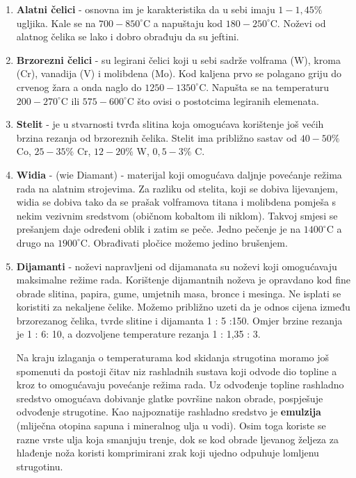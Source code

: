 \documentclass[a4paper,12pt]{article}
\numberwithin{figure}{section}
\begin{document}
\begin{enumerate}
\item \textbf{Alatni čelici} - osnovna im je karakteristika da u sebi imaju $1-1,45\%$ ugljika. Kale se na $700 - 850^{\circ}$C a napuštaju kod $180 - 250^{\circ}$C. Noževi od alatnog čelika se lako i dobro obrađuju da su jeftini.
\item \textbf{Brzorezni čelici} - su legirani čelici koji u sebi sadrže volframa (W), kroma (Cr), vanadija (V) i molibdena (Mo). Kod kaljena prvo se polagano griju do crvenog žara a onda naglo do $1250 - 1350^{\circ}$C. Napušta se na temperaturu $200 - 270^{\circ}$C ili $575 - 600^{\circ}$C što ovisi o postotcima legiranih elemenata.
\item \textbf{Stelit} - je u stvarnosti tvrđa slitina koja omogućava korištenje još većih brzina rezanja od brzoreznih čelika. Stelit ima približno sastav od $40-50\%$ Co, $25 - 35\%$ Cr, $12 - 20\%$ W, $0,5-3\%$ C.
\item \textbf{Widia} - (wie Diamant) - materijal koji omogućava daljnje povećanje režima rada na alatnim strojevima. Za razliku od stelita, koji se dobiva lijevanjem, widia se dobiva tako da se prašak volframova titana i molibdena pomješa s nekim vezivnim sredstvom (običnom kobaltom ili niklom). Takvoj smjesi se prešanjem daje određeni oblik i zatim se peče. Jedno pečenje je na $1400^{\circ}$C a drugo na $1900^{\circ}$C. Obrađivati pločice možemo jedino brušenjem.
\item \textbf{Dijamanti} - noževi napravljeni od dijamanata su noževi koji omogućavaju maksimalne režime rada. Korištenje dijamantnih noževa je opravdano kod fine obrade slitina, papira, gume, umjetnih masa, bronce i mesinga. Ne isplati se koristiti za nekaljene čelike. Možemo približno uzeti da je odnos cijena između brzorezanog čelika, tvrde slitine i dijamanta 1 : 5 :150. Omjer brzine rezanja je 1 : 6: 10, a dozvoljene temperature rezanja 1 : 1,35 : 3.\par
Na kraju izlaganja o temperaturama kod skidanja strugotina moramo još spomenuti da postoji čitav niz rashladnih sustava koji odvode dio topline a kroz to omogućavaju povećanje režima rada. Uz odvođenje topline rashladno sredstvo omogućava dobivanje glatke površine nakon obrade, pospješuje odvođenje strugotine. Kao najpoznatije rashladno sredstvo je \textbf{emulzija} (mliječna otopina sapuna i mineralnog ulja u vodi). Osim toga koriste se razne vrste ulja koja smanjuju trenje, dok se kod obrade ljevanog željeza za hlađenje noža koristi komprimirani zrak koji ujedno odpuhuje lomljenu strugotinu.
\end{enumerate}
\end{document}
